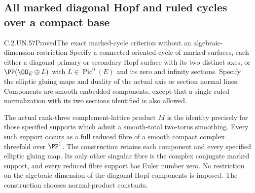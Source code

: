 \subsection{All marked diagonal Hopf and ruled cycles over a compact base}

\begin{statement}{C.2.UN.57}{Proved}{The exact marked-cycle criterion without an algebraic-dimension restriction}
Specify a connected oriented cycle of marked surfaces, each either a
diagonal primary or secondary Hopf surface with its two distinct axes,
or $\PP(\OO_E\oplus L)$ with $L\in\operatorname{Pic}^0(E)$ and its
zero and infinity sections. Specify the elliptic gluing maps and
duality of the actual axis or section normal lines. Components are
smooth embedded components, except that a single ruled normalization
with its two sections identified is also allowed.

The actual rank-three complement-lattice product $M$ is the identity
precisely for those specified supports which admit a smooth-total
two-torus smoothing. Every such support occurs as a full reduced fibre
of a smooth compact complex threefold over $\PP^1$. The construction
retains each component and every specified elliptic gluing map. Its
only other singular fibre is the complex conjugate marked support,
and every reduced fibre support has Euler number zero. No restriction
on the algebraic dimension of the diagonal Hopf components is imposed.
The construction chooses normal-product constants.
\end{statement}

